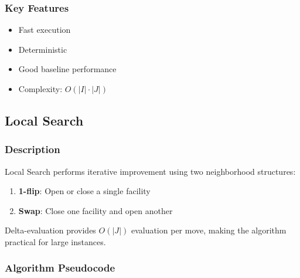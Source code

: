 \documentclass[11pt,a4paper]{article}
\begin{document}
\subsubsection{Key Features}
\begin{itemize}
  \item Fast execution
  \item Deterministic
  \item Good baseline performance
  \item Complexity: $O(|I| \cdot |J|)$
\end{itemize}

\subsection{Local Search}

\subsubsection{Description}

Local Search performs iterative improvement using two neighborhood structures:
\begin{enumerate}
  \item \textbf{1-flip}: Open or close a single facility
  \item \textbf{Swap}: Close one facility and open another
\end{enumerate}

Delta-evaluation provides $O(|J|)$ evaluation per move, making the algorithm practical for large instances.

\subsubsection{Algorithm Pseudocode}
\end{document}
